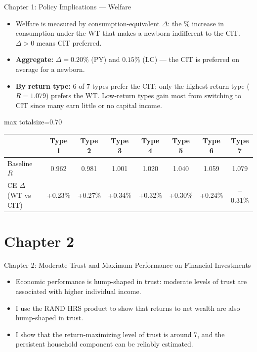 \documentclass{beamer}
\newcommand{\slidetable}[1]{%
  \begin{center}
  \begin{adjustbox}{max totalsize={\textwidth}{0.70\textheight}}
  #1
  \end{adjustbox}
  \end{center}
}
\begin{document}
\begin{frame}[label=ch1-welfare]{Chapter 1: Policy Implications — Welfare}
  \scriptsize
  \begin{itemize}
    \item Welfare is measured by consumption-equivalent $\Delta$: the \% increase in consumption under the WT that makes a newborn indifferent to the CIT. $\Delta > 0$ means CIT preferred.
    \item \textbf{Aggregate:} $\Delta = 0.20\%$ (PY) and $0.15\%$ (LC) --- the CIT is preferred on average for a newborn.
    \item \textbf{By return type:} 6 of 7 types prefer the CIT; only the highest-return type ($R=1.079$) prefers the WT. Low-return types gain most from switching to CIT since many earn little or no capital income.
  \end{itemize}
  \vspace{0.3em}
  \slidetable{
  \begin{tabular}{lccccccc}
    \toprule
    & \textbf{Type 1} & \textbf{Type 2} & \textbf{Type 3} & \textbf{Type 4} & \textbf{Type 5} & \textbf{Type 6} & \textbf{Type 7} \\
    \midrule
    Baseline $R$ & 0.962 & 0.981 & 1.001 & 1.020 & 1.040 & 1.059 & 1.079 \\
    CE $\Delta$ (WT vs CIT) & +0.23\% & +0.27\% & +0.34\% & +0.32\% & +0.30\% & +0.24\% & $-$0.31\% \\
    \bottomrule
  \end{tabular}
  }
\end{frame}


\section{Chapter 2}

\begin{frame}{Chapter 2: Moderate Trust and Maximum Performance on Financial Investments}
  \begin{itemize}
    \item Economic performance is hump-shaped in trust: moderate levels of trust are associated with higher individual income.
    \item I use the RAND HRS product to show that returns to net wealth are also hump-shaped in trust.
    \item I show that the return-maximizing level of trust is around 7, and the persistent household component can be reliably estimated.
  \end{itemize}
\end{frame}
\end{document}
